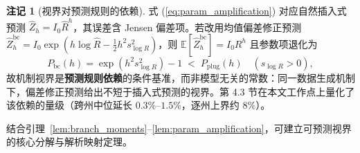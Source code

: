\documentclass[11pt,a4paper]{article}
\theoremstyle{plain}
\theoremstyle{definition}
\newtheorem*{remark}{注记}
\begin{document}
\begin{remark}[视界对预测规则的依赖]\label{rem:predictor}
式 (\ref{eq:param_amplification}) 对应自然插入式预测 $\hat{Z}_h = I_0 \hat{R}^h$，其误差含 Jensen 偏差项。若改用均值偏差修正预测 $\hat{Z}_h^{\text{bc}} = I_0 \exp\!\left(h\log\hat{R} - \tfrac{1}{2} h^2 s_{\log R}^2\right)$，则 $\mathbb{E}[\hat{Z}_h^{\text{bc}}] = I_0 R^h$ 且参数项退化为
\begin{equation}
P_{\text{bc}}(h) = \exp\!\left(h^2 s_{\log R}^2\right) - 1 \;<\; P_{\text{plug}}(h) \quad (s_{\log R} > 0),
\label{eq:p_bc}
\end{equation}
故机制视界是\textbf{预测规则依赖}的条件基准，而非模型无关的常数：同一数据生成机制下，偏差修正预测给出不短于插入式预测的视界。第 4.3 节在本文工作点上量化了该依赖的量级（跨州中位延长 $0.3\%$--$1.5\%$，逐州上界约 $8\%$）。
\end{remark}

结合引理~\ref{lem:branch_moments}--\ref{lem:param_amplification}，可建立可预测视界的核心分解与解析映射定理。
\end{document}
